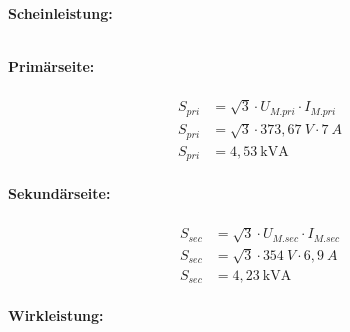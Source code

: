 \begin{enumerate}[label=\alph*)]
	      \textbf{Scheinleistung:}\\ \ \\
	      \begin{tcolorbox}[colback=gray!30,
			      colframe=black,
			      width=0.9\textwidth,
		      ]
		      \parbox{\textwidth}{

			      \begin{minipage}{0.5\textwidth}
				      \textbf{Primärseite:}\\ \ \\
				      \begin{align*}
					      S_{pri} & = \sqrt3\cdot U_{M.pri}\cdot I_{M.pri} \\
					      S_{pri} & = \sqrt3\cdot 373,67\ V\cdot 7\ A      \\
					      S_{pri} & = 4,53\ \text{kVA}         \\
				      \end{align*}
			      \end{minipage}\hfill
			      \begin{minipage}{0.5\textwidth}
				      \textbf{Sekundärseite:}\\ \ \\
				      \begin{align*}
					      S_{sec} & = \sqrt3\cdot U_{M.sec}\cdot I_{M.sec} \\
					      S_{sec} & = \sqrt3\cdot 354\ V\cdot 6,9\ A       \\
					      S_{sec} & = 4,23\ \text{kVA}         \\
				      \end{align*}
			      \end{minipage}
		      }
	      \end{tcolorbox}


	      \pagebreak
	      \textbf{Wirkleistung:}\\ \ \\
	      \begin{tcolorbox}[colback=gray!30,
			      colframe=black,
			      width=0.9\textwidth,
		      ]
		      \parbox{\textwidth}{

}
\end{tcolorbox}
\end{enumerate}
